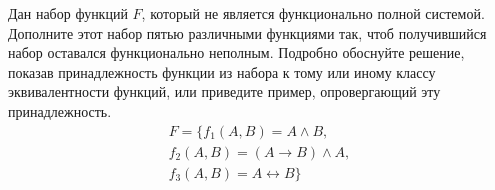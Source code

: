 \question
Дан набор функций $F$, который не является функционально полной системой. Дополните этот набор пятью различными функциями так, чтоб получившийся набор оставался функционально неполным. Подробно обоснуйте решение, показав  принадлежность функции из набора к тому или иному классу эквивалентности функций, или приведите пример, опровергающий эту принадлежность.
\begin{gather*}
F = \{f_1(A,B) = A \land B, \\
f_2(A,B) = (A \to B)\land A, \\
f_3(A,B) = A \leftrightarrow B\}
\end{gather*}
